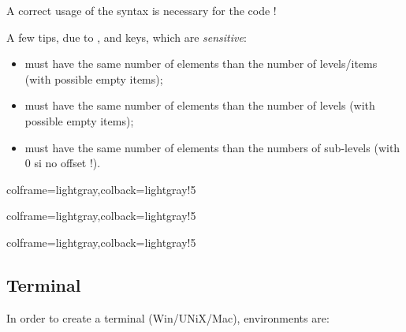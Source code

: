 \documentclass[11pt,a4paper]{ltxdoc}
\begin{document}
A correct usage of the syntax is necessary for the code !

\vspace{5mm}

A few tips, due to ,  and  keys, which are \textit{sensitive}:

\begin{itemize}
	\item {} must have the same number of elements than the number of levels/items (with possible empty items);
	\item {} must have the same number of elements than the number of levels (with possible empty items);
	\item {} must have the same number of elements than the numbers of sub-levels (with 0 si no offset !).
\end{itemize}

\begin{tcblisting}{colframe=lightgray,colback=lightgray!5}
\end{tcblisting}

\begin{tcblisting}{colframe=lightgray,colback=lightgray!5}
\end{tcblisting}

\begin{tcblisting}{colframe=lightgray,colback=lightgray!5}
\end{tcblisting}

\pagebreak

\subsection{Terminal}

In order to create a terminal (Win/UNiX/Mac), environments are:
\end{document}
